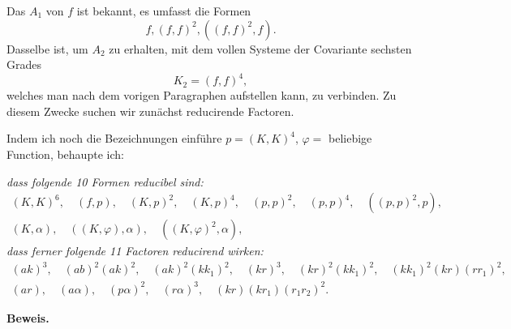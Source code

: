 \documentclass[10pt]{article}
\begin{document}
Das $A_1$ von $f$ ist bekannt, es umfasst die Formen
\[
f,(f,f)^2,((f,f)^2,f).
\]
Dasselbe ist, um $A_2$ zu erhalten, mit dem vollen Systeme der Covariante sechsten Grades
\[
K_2=(f,f)^4,
\]
welches man nach dem vorigen Paragraphen aufstellen kann, zu verbinden. Zu diesem Zwecke suchen wir zunächst reducirende Factoren.

Indem ich noch die Bezeichnungen einführe $p=(K,K)^4$, $\varphi=$ beliebige Function, behaupte ich:

\textit{dass folgende 10 Formen reducibel sind:}
\[
\begin{gathered}
(K,K)^6,
\quad (f,p),
\quad (K,p)^2,
\quad (K,p)^4,
\quad (p,p)^2,
\quad (p,p)^4,
\quad ((p,p)^2,p),\\
(K,\alpha),
\quad ((K,\varphi),\alpha),
\quad ((K,\varphi)^2,\alpha),
\end{gathered}
\]
\textit{dass ferner folgende 11 Factoren reducirend wirken:}
\[
\begin{gathered}
(ak)^3,
\quad (ab)^2(ak)^2,
\quad (ak)^2(kk_1)^2,
\quad (kr)^3,
\quad (kr)^2(kk_1)^2,
\quad (kk_1)^2(kr)(rr_1)^2,\\
(ar),
\quad (a\alpha),
\quad (p\alpha)^2,
\quad (r\alpha)^3,
\quad (kr)(kr_1)(r_1r_2)^2.
\end{gathered}
\]

\begin{center}
{\bfseries Beweis.}
\end{center}
\end{document}
